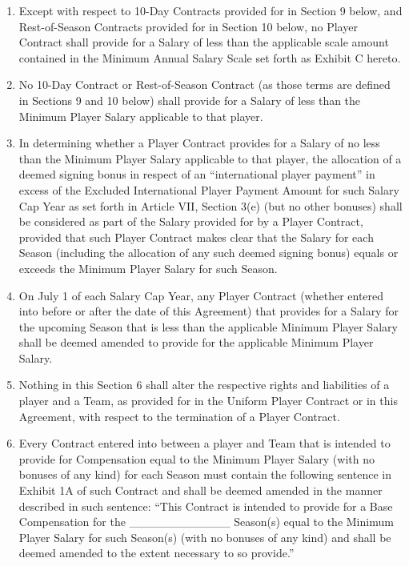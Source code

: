 \documentclass[
]{book}
\begin{document}
\begin{enumerate}
\def\labelenumi{(\alph{enumi})}
\item
  Except with respect to 10-Day Contracts provided for in Section 9 below, and Rest-of-Season Contracts provided for in Section 10 below, no Player Contract shall provide for a Salary of less than the applicable scale amount contained in the Minimum Annual Salary Scale set forth as Exhibit C hereto.
\item
  No 10-Day Contract or Rest-of-Season Contract (as those terms are defined in Sections 9 and 10 below) shall provide for a Salary of less than the Minimum Player Salary applicable to that player.
\item
  In determining whether a Player Contract provides for a Salary of no less than the Minimum Player Salary applicable to that player, the allocation of a deemed signing bonus in respect of an ``international player payment'' in excess of the Excluded International Player Payment Amount for such Salary Cap Year as set forth in Article VII, Section 3(e) (but no other bonuses) shall be considered as part of the Salary provided for by a Player Contract, provided that such Player Contract makes clear that the Salary for each Season (including the allocation of any such deemed signing bonus) equals or exceeds the Minimum Player Salary for such Season.
\item
  On July 1 of each Salary Cap Year, any Player Contract (whether entered into before or after the date of this Agreement) that provides for a Salary for the upcoming Season that is less than the applicable Minimum Player Salary shall be deemed amended to provide for the applicable Minimum Player Salary.
\item
  Nothing in this Section 6 shall alter the respective rights and liabilities of a player and a Team, as provided for in the Uniform Player Contract or in this Agreement, with respect to the termination of a Player Contract.
\item
  Every Contract entered into between a player and Team that is intended to provide for Compensation equal to the Minimum Player Salary (with no bonuses of any kind) for each Season must contain the following sentence in Exhibit 1A of such Contract and shall be deemed amended in the manner described in such sentence: ``This Contract is intended to provide for a Base Compensation for the \_\_\_\_\_\_\_\_\_\_\_\_ Season(s) equal to the Minimum Player Salary for such Season(s) (with no bonuses of any kind) and shall be deemed amended to the extent necessary to so provide.''

\end{enumerate}
\end{document}
